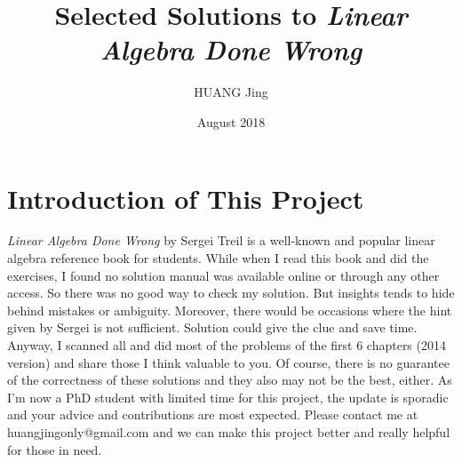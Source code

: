 \documentclass[11pt, a4paper]{article}
\title{Selected Solutions to \emph{Linear Algebra Done Wrong}}
\author{HUANG Jing }
\date{August 2018}
\begin{document}
\maketitle

\section*{Introduction of This Project}
\emph{Linear Algebra Done Wrong} by Sergei Treil is a well-known and popular linear algebra 
reference book for students. While when I read this book and did the exercises, I found no solution manual was available online or through any other access. So there was no good
way to check my solution. But insights tends to hide behind mistakes or ambiguity. Moreover, 
there would be occasions where the hint given by Sergei is not sufficient. Solution could give the  
clue and save time. Anyway, I scanned all and did most of the problems of the first 6 chapters (2014 version) and share those I think valuable to you. Of course, there is no guarantee of the correctness of these solutions and they also may not be
the best, either. As I'm now a PhD student
with limited time for this project, the update is sporadic and your advice and contributions are most expected. Please contact me at huangjingonly@gmail.com and we can make this project better and really helpful for those in need. 
\end{document}
